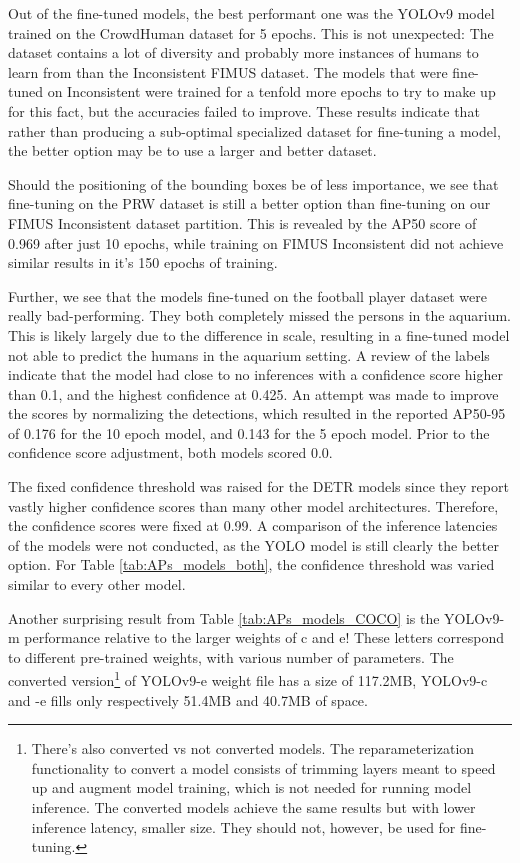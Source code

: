 Out of the fine-tuned models, the best performant one was the YOLOv9 model trained on the CrowdHuman dataset for 5 epochs. This is not unexpected: The dataset contains a lot of diversity and probably more instances of humans to learn from than the Inconsistent FIMUS dataset. The models that were fine-tuned on Inconsistent were trained for a tenfold more epochs to try to make up for this fact, but the accuracies failed to improve. These results indicate that rather than producing a sub-optimal specialized dataset for fine-tuning a model, the better option may be to use a larger and better dataset. 

Should the positioning of the bounding boxes be of less importance, we see that fine-tuning on the PRW dataset is still a better option than fine-tuning on our FIMUS Inconsistent dataset partition. This is revealed by the AP50 score of 0.969 after just 10 epochs, while training on FIMUS Inconsistent did not achieve similar results in it's 150 epochs of training. 

Further, we see that the models fine-tuned on the football player dataset were really bad-performing. They both completely missed the persons in the aquarium. This is likely largely due to the difference in scale, resulting in a fine-tuned model not able to predict the humans in the aquarium setting. A review of the labels indicate that the model had close to no inferences with a confidence score higher than 0.1, and the highest confidence at 0.425. An attempt was made to improve the scores by normalizing the detections, which resulted in the reported AP50-95 of 0.176 for the 10 epoch model, and 0.143 for the 5 epoch model. Prior to the confidence score adjustment, both models scored 0.0. 

The fixed confidence threshold was raised for the DETR models since they report vastly higher confidence scores than many other model architectures. Therefore, the confidence scores were fixed at 0.99. A comparison of the inference latencies of the models were not conducted, as the YOLO model is still clearly the better option. For Table \ref{tab:APs_models_both}, the confidence threshold was varied similar to every other model.

Another surprising result from Table \ref{tab:APs_models_COCO} is the YOLOv9-m performance relative to the larger weights of c and e! These letters correspond to different pre-trained weights, with various number of parameters. The converted version\footnote{There's also converted vs not converted models. The reparameterization functionality to convert a model consists of trimming layers meant to speed up and augment model training, which is not needed for running model inference. The converted models achieve the same results but with lower inference latency, smaller size. They should not, however, be used for fine-tuning.} of YOLOv9-e weight file has a size of 117.2MB, YOLOv9-c and -e fills only respectively 51.4MB and 40.7MB of space.

